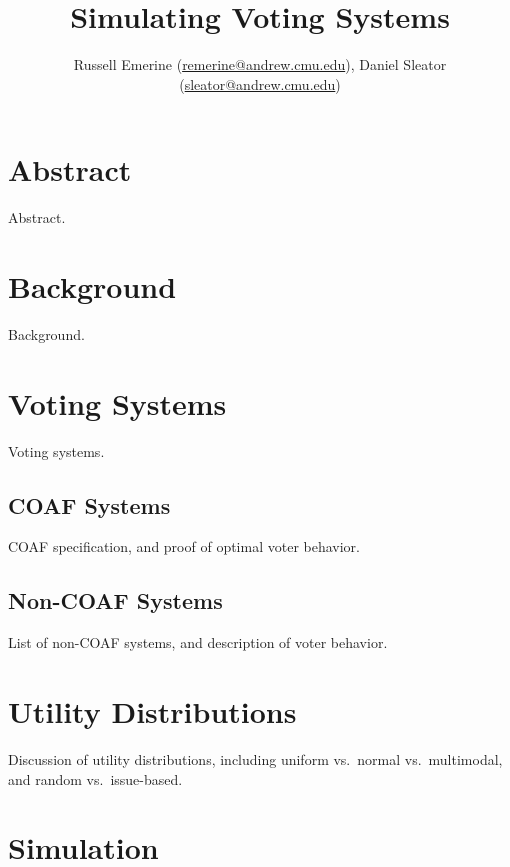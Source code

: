 \documentclass[12pt]{article}
\begin{document}
    \setlength{\parindent}{0pt}
    \setlength{\parskip}{5pt}
    \setlength{\headheight}{14.49999pt}
    \addtolength{\topmargin}{-1.59999pt}

    \title{Simulating Voting Systems}
    \author{\normalsize{Russell Emerine (\url{remerine@andrew.cmu.edu}), Daniel Sleator (\url{sleator@andrew.cmu.edu})}}
    \date{}

    \maketitle

    \section{Abstract}\label{sec:abstract}

    Abstract.

    \section{Background}

    Background.

    \section{Voting Systems}

    Voting systems.

    \subsection{COAF Systems}

    COAF specification, and proof of optimal voter behavior.

    \subsection{Non-COAF Systems}

    List of non-COAF systems, and description of voter behavior.

    \section{Utility Distributions}

    Discussion of utility distributions, including uniform vs.\ normal
    vs.\ multimodal, and random vs.\ issue-based.

    \section{Simulation}
\end{document}

